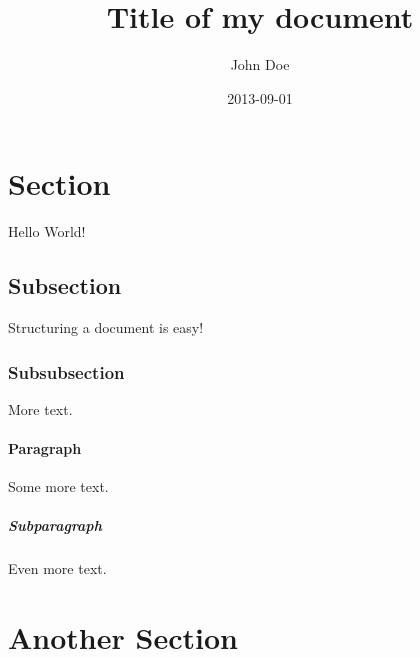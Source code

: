 \documentclass{article}
\title{Title of my document}
\date{2013-09-01}
\author{John Doe}
\begin{document}
\maketitle
{}
\newpage
{}


\newpage


\section{Section}
Hello World!
\subsection{Subsection}
Structuring a document is easy!
\subsubsection{Subsubsection}
More text.
\paragraph{Paragraph}
Some more text.
\subparagraph{Subparagraph}
Even more text.
\section{Another Section}


\newpage
\end{document}
